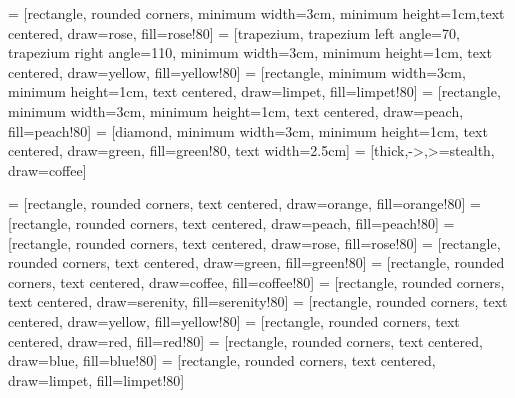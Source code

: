 \usepackage[T1]{fontenc}
\usepackage[a4paper, total={6.5in, 9in}]{geometry}

\usepackage{bm}
\usepackage{tikz}
\usepackage{float}
\usepackage{minted}
\usepackage{amsmath}
\usepackage{amssymb}
\usepackage{booktabs}
\usepackage{palatino}
\usepackage{todonotes}
\usepackage{subcaption}

\usepackage[inline]{enumitem}

\usepackage{nomencl}
\makenomenclature%



\usetikzlibrary{shapes.geometric, arrows}
 = [rectangle, rounded corners, minimum width=3cm, minimum height=1cm,text centered, draw=rose, fill=rose!80]
 = [trapezium, trapezium left angle=70, trapezium right angle=110, minimum width=3cm, minimum height=1cm, text centered, draw=yellow, fill=yellow!80]
 = [rectangle, minimum width=3cm, minimum height=1cm, text centered, draw=limpet, fill=limpet!80]
 = [rectangle, minimum width=3cm, minimum height=1cm, text centered, draw=peach, fill=peach!80]
 = [diamond, minimum width=3cm, minimum height=1cm, text centered, draw=green, fill=green!80, text width=2.5cm]
 = [thick,->,>=stealth, draw=coffee]

 = [rectangle, rounded corners, text centered, draw=orange, fill=orange!80]
 = [rectangle, rounded corners, text centered, draw=peach, fill=peach!80]
 = [rectangle, rounded corners, text centered, draw=rose, fill=rose!80]
 = [rectangle, rounded corners, text centered, draw=green, fill=green!80]
 = [rectangle, rounded corners, text centered, draw=coffee, fill=coffee!80]
 = [rectangle, rounded corners, text centered, draw=serenity, fill=serenity!80]
 = [rectangle, rounded corners, text centered, draw=yellow, fill=yellow!80]
 = [rectangle, rounded corners, text centered, draw=red, fill=red!80]
 = [rectangle, rounded corners, text centered, draw=blue, fill=blue!80]
 = [rectangle, rounded corners, text centered, draw=limpet, fill=limpet!80]
